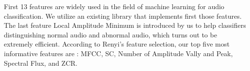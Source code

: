 First 13 features are widely used in the field of machine learning for audio classification\cite{b26}\cite{b27}. We utilize an existing library\cite{b6} that implements first those features. The last feature Local Amplitude Minimum is introduced by us to help classifiers distinguishing normal audio and abnormal audio, which turns out to be extremely efficient. According to Renyi's feature selection, our top five most informative features are : MFCC, SC, Number of Amplitude Vally and Peak, Spectral Flux, and ZCR. 